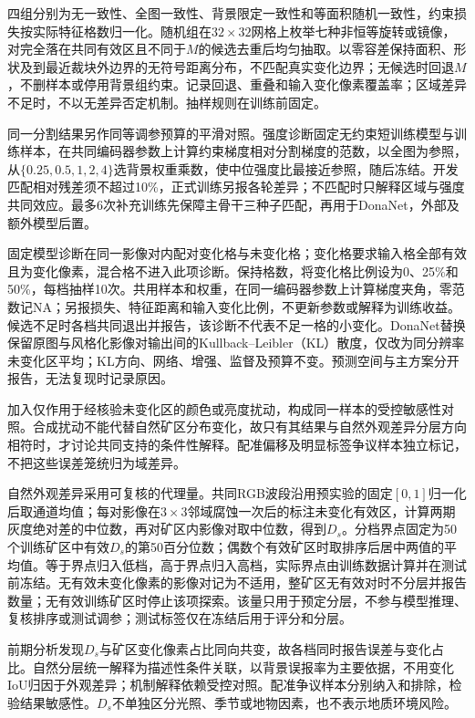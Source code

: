 四组分别为无一致性、全图一致性、背景限定一致性和等面积随机一致性，约束损失按实际特征格数归一化。随机组在$32\times32$网格上枚举七种非恒等旋转或镜像，对完全落在共同有效区且不同于$M$的候选去重后均匀抽取。以零容差保持面积、形状及到最近裁块外边界的无符号距离分布，不匹配真实变化边界；无候选时回退$M$，不删样本或停用背景组约束。记录回退、重叠和输入变化像素覆盖率；区域差异不足时，不以无差异否定机制。抽样规则在训练前固定。

同一分割结果另作同等调参预算的平滑对照。强度诊断固定无约束短训练模型与训练样本，在共同编码器参数上计算约束梯度相对分割梯度的范数，以全图为参照，从$\{0.25,0.5,1,2,4\}$选背景权重乘数，使中位强度比最接近参照，随后冻结。开发匹配相对残差须不超过10\%，正式训练另报各轮差异；不匹配时只解释区域与强度共同效应。最多6次补充训练先保障主骨干三种子匹配，再用于DonaNet，外部及额外模型后置。

固定模型诊断在同一影像对内配对变化格与未变化格；变化格要求输入格全部有效且为变化像素，混合格不进入此项诊断。保持格数，将变化格比例设为0、25\%和50\%，每档抽样10次。共用样本和权重，在同一编码器参数上计算梯度夹角，零范数记NA；另报损失、特征距离和输入变化比例，不更新参数或解释为训练收益。候选不足时各档共同退出并报告，该诊断不代表不足一格的小变化。DonaNet替换保留原图与风格化影像对输出间的Kullback--Leibler（KL）散度，仅改为同分辨率未变化区平均；KL方向、网络、增强、监督及预算不变。预测空间与主方案分开报告，无法复现时记录原因。

加入仅作用于经核验未变化区的颜色或亮度扰动，构成同一样本的受控敏感性对照。合成扰动不能代替自然矿区分布变化，故只有其结果与自然外观差异分层方向相符时，才讨论共同支持的条件性解释。配准偏移及明显标签争议样本独立标记，不把这些误差笼统归为域差异。

自然外观差异采用可复核的代理量。共同RGB波段沿用预实验的固定$[0,1]$归一化后取通道均值；每对影像在$3\times3$邻域腐蚀一次后的标注未变化有效区，计算两期灰度绝对差的中位数，再对矿区内影像对取中位数，得到$D_s$。分档界点固定为50个训练矿区中有效$D_s$的第50百分位数；偶数个有效矿区时取排序后居中两值的平均值。等于界点归入低档，高于界点归入高档，实际界点由训练数据计算并在测试前冻结。无有效未变化像素的影像对记为不适用，整矿区无有效对时不分层并报告数量；无有效训练矿区时停止该项探索。该量只用于预定分层，不参与模型推理、复核排序或测试调参；测试标签仅在冻结后用于评分和分层。

前期分析发现$D_s$与矿区变化像素占比同向共变，故各档同时报告误差与变化占比。自然分层统一解释为描述性条件关联，以背景误报率为主要依据，不用变化IoU归因于外观差异；机制解释依赖受控对照。配准争议样本分别纳入和排除，检验结果敏感性。$D_s$不单独区分光照、季节或地物因素，也不表示地质环境风险。

